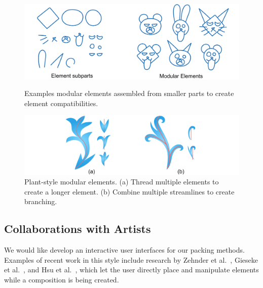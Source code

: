 \begin{figure}[t]
\centering
\includegraphics[width=1.0\textwidth]{figures/conclusions/modular.pdf}
\caption[Modular elements]
{ \label{modular_element} 
\nnewtext
{
Examples modular elements assembled from smaller parts to create element compatibilities.
}
}
\includegraphics[width=1.0\textwidth]{figures/conclusions/thread_branch_3.pdf}
\caption[Element threading and branching]
{ \label{thread_branch} 
\nnewtext
{
Plant-style modular elements.
(a) Thread multiple elements to create a longer element.
(b) Combine multiple streamlines to create branching.
}
}
\end{figure}


\subsection{Collaborations with Artists}

We would like develop an interactive user interfaces for our packing methods.
Examples of recent work in this style include research
by Zehnder et al.~\cite{Zehnder2016}, Gieseke et al.~\cite{Gieseke2017}, 
and Hsu et al.~\cite{Hsu2020}, which let the user directly place and manipulate
elements while a composition is being created.


